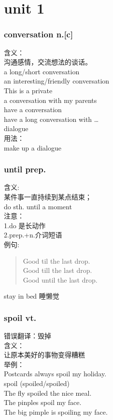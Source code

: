 \documentclass[twocolumn]{ctexbook}
\newcommand{\phrase}[1]{{\colorbox{yellow!40}{#1}}}
\newcommand{\word}[1]{{\em\color{black}{#1}}}
\newcommand{\sentence}[1]{{\colorbox[gray]{0.8}{#1}}}
\newcommand{\expand}[1]{{\Large\colorbox{-red!90}{#1}}}
\begin{document}
	
	\part{unit 1}
	\section{conversation n.[c]}
	含义：\\
	沟通感情，交流想法的谈话。\\
	a \phrase{long/short} conversation\\
	an interesting/friendly conversation\\
	This is a \phrase{private \word{conversation}}\\
	\sentence{a conversation with my parents}\\
	\phrase{have a conversation}\\
	\sentence{have a long conversation with \ldots}\\
	\expand{dialogue}\\
	用法：\\
	make up a dialogue\\
	\section{until prep.}
	含义:\\
	某件事一直持续到某点结束；\\
	do sth. until a moment\\
	注意：\\
	1.do 是长动作\\
	2.prep.+n.介词短语\\
	例句:\begin{quote}
		Good til the last drop.\\
		Good till the last drop.\\
		Good until the last drop.\\
	\end{quote}
	\phrase{stay in bed 睡懒觉}\\
	\section{spoil vt.}
	错误翻译：毁掉\\
	含义：\\
	让{\color{red}原本美好}的事物变得{\color{red}糟糕}\\
	举例：\\
	Postcards always spoil my holiday.\\
	spoil (spoiled/spoiled)  \\
	The fly spoiled the nice meal.  \\
	The pinples spoil my face.\\
	The big pimple is spoiling my face.\\
\end{document}
